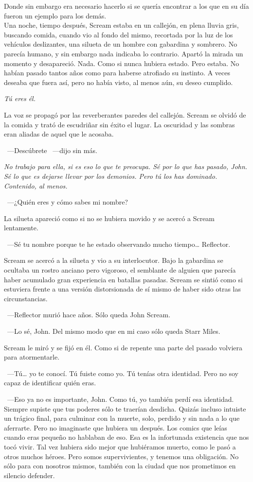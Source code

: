 Donde sin embargo era necesario hacerlo si se quería encontrar a los que en su día fueron un ejemplo para los demás.\\

\noindent{}Una noche, tiempo después, Scream estaba en un callejón, en plena lluvia gris, buscando comida, cuando vio al fondo del mismo, recortada por la luz de los vehículos deslizantes, una silueta de un hombre con gabardina y sombrero. No parecía humano, y sin embargo nada indicaba lo contrario. Apartó la mirada un momento y desapareció. Nada. Como si nunca hubiera estado. Pero estaba. No habían pasado tantos años como para haberse atrofiado su instinto. A veces deseaba que fuera así, pero no había visto, al menos aún, su deseo cumplido.

\emph{Tú eres él.}

La voz se propagó por las reverberantes paredes del callejón. Scream se olvidó de la comida y trató de escudriñar sin éxito el lugar. La oscuridad y las sombras eran aliadas de aquel que le acosaba.

~---Descúbrete ~---dijo sin más.

\emph{No trabajo para ella, si es eso lo que te preocupa. Sé por lo que has pasado, John. Sé lo que es dejarse llevar por los demonios. Pero tú los has dominado. Contenido, al menos.}

~---¿Quién eres y cómo sabes mi nombre?

La silueta apareció como si no se hubiera movido y se acercó a Scream lentamente.

~---Sé tu nombre porque te he estado observando mucho tiempo\dots{} Reflector.

Scream se acercó a la silueta y vio a su interlocutor. Bajo la gabardina se ocultaba un rostro anciano pero vigoroso, el semblante de alguien que parecía haber acumulado gran experiencia en batallas pasadas. Scream se sintió como si estuviera frente a una versión distorsionada de sí mismo de haber sido otras las circunstancias.

~---Reflector murió hace años. Sólo queda John Scream.

~---Lo sé, John. Del mismo modo que en mi caso sólo queda Starr Miles.

Scream le miró y se fijó en él. Como si de repente una parte del pasado volviera para atormentarle.

~---Tú\dots{} yo te conocí. Tú fuiste como yo. Tú tenías otra identidad. Pero no soy capaz de identificar quién eras.

~---Eso ya no es importante, John. Como tú, yo también perdí esa identidad. Siempre supiste que tus poderes sólo te traerían desdicha. Quizás incluso intuiste un trágico final, para culminar con la muerte, solo, perdido y sin nada a lo que aferrarte. Pero no imaginaste que hubiera un después. Los comics que leías cuando eras pequeño no hablaban de eso. Esa es la infortunada existencia que nos tocó vivir. Tal vez hubiera sido mejor que hubiéramos muerto, como le pasó a otros muchos héroes. Pero somos supervivientes, y tenemos una obligación. No sólo para con nosotros mismos, también con la ciudad que nos prometimos en silencio defender.

